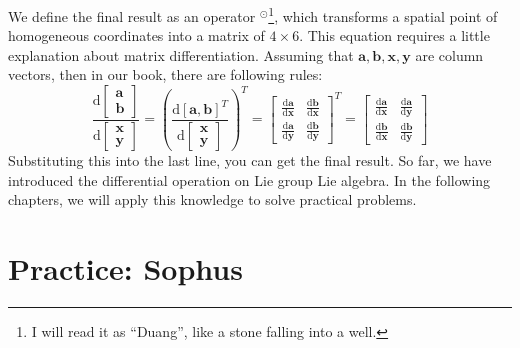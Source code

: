 We define the final result as an operator $^\odot$\footnote{I will read it as ``Duang'', like a stone falling into a well.}, which transforms a spatial point of homogeneous coordinates into a matrix of $4 \times 6$. This equation requires a little explanation about matrix differentiation. Assuming that $\mathbf{a}, \mathbf{b}, \mathbf{x}, \mathbf{y}$ are column vectors, then in our book, there are following rules:
\begin{equation}
\frac{\mathrm{\mathrm{d}}\begin{bmatrix}
    \mathbf{a}\\
    \mathbf{b}
    \end{bmatrix}}{{\mathrm{d} \begin{bmatrix}
        \mathbf{x}\\
        \mathbf{y}
        \end{bmatrix}}} = {\left( \frac{\mathrm{d}[\mathbf{a},\mathbf{b}]^T}{{\mathrm{d}\begin{bmatrix}
            \mathbf{x}\\
            \mathbf{y}
            \end{bmatrix}}} \right)^T} = {{\begin{bmatrix}
        {\frac{{\mathrm{d}\mathbf{a}}}{{\mathrm{d}\mathbf{x}}}}&{\frac{{\mathrm{d}\mathbf{b}}}{{\mathrm{d}\mathbf{x}}}}\\
        {\frac{{\mathrm{d}\mathbf{a}}}{{\mathrm{d}\mathbf{y}}}}&{\frac{{\mathrm{d}\mathbf{b}}}{{\mathrm{d}\mathbf{y}}}}
        \end{bmatrix}} ^T} = {\begin{bmatrix}
    {\frac{{\mathrm{d}\mathbf{a}}}{{\mathrm{d}\mathbf{x}}}}&{\frac{{\mathrm{d}\mathbf{a}}}{{\mathrm{d}\mathbf{y}}}}\\
    {\frac{{\mathrm{d}\mathbf{b}}}{{\mathrm{d}\mathbf{x}}}}&{\frac{{\mathrm{d}\mathbf{b}}}{{\mathrm{d}\mathbf{y}}}}
    \end{bmatrix}}
\end{equation}
Substituting this into the last line, you can get the final result. So far, we have introduced the differential operation on Lie group Lie algebra. In the following chapters, we will apply this knowledge to solve practical problems. 

\section{Practice: Sophus}
